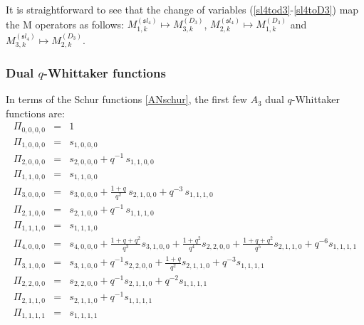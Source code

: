 \documentclass[12pt]{amsart}
\numberwithin{equation}{section}
\numberwithin{table}{section}
\begin{document}
\begin{appendix}
It is straightforward to see that the change of variables (\ref{sl4tod3}-\ref{sl4toD3}) map the M operators as follows:  $M_{1,k}^{({\mathfrak sl}_4)}\mapsto M_{3,k}^{(D_3)}$, $M_{2,k}^{({\mathfrak sl}_4)}\mapsto M_{1,k}^{(D_3)}$ and $M_{3,k}^{({\mathfrak sl}_4)}\mapsto M_{2,k}^{(D_3)}$.


\subsubsection{Dual $q$-Whittaker functions}

In terms of the Schur functions \eqref{ANschur}, the first few $A_3$ dual $q$-Whittaker functions are:
\begin{eqnarray*}
\Pi_{0,0,0,0}&=&1\\
\Pi_{1,0,0,0}&=&s_{1,0,0,0}\\
\Pi_{2,0,0,0}&=&s_{2,0,0,0}+q^{-1}\, s_{1,1,0,0}\\
\Pi_{1,1,0,0}&=&s_{1,1,0,0}\\
\Pi_{3,0,0,0}&=&s_{3,0,0,0}+\frac{1+q}{q^2}\, s_{2,1,0,0}+ q^{-3}\, s_{1,1,1,0}\\
\Pi_{2,1,0,0}&=&s_{2,1,0,0}+q^{-1}\, s_{1,1,1,0}\\
\Pi_{1,1,1,0}&=&s_{1,1,1,0}\\
\Pi_{4,0,0,0}&=&s_{4,0,0,0}+\frac{1+q+q^2}{q^3}s_{3,1,0,0}+\frac{1+q^2}{q^4}s_{2,2,0,0}+\frac{1+q+q^2}{q^5}s_{2,1,1,0}+q^{-6}s_{1,1,1,1}\\
\Pi_{3,1,0,0}&=&s_{3,1,0,0}+q^{-1}s_{2,2,0,0}+\frac{1+q}{q^2}s_{2,1,1,0}+q^{-3}s_{1,1,1,1}\\
\Pi_{2,2,0,0}&=&s_{2,2,0,0}+q^{-1}s_{2,1,1,0}+q^{-2}s_{1,1,1,1}\\
\Pi_{2,1,1,0}&=&s_{2,1,1,0}+q^{-1}s_{1,1,1,1}\\
\Pi_{1,1,1,1}&=&s_{1,1,1,1}
\end{eqnarray*}


\end{appendix}
\end{document}
